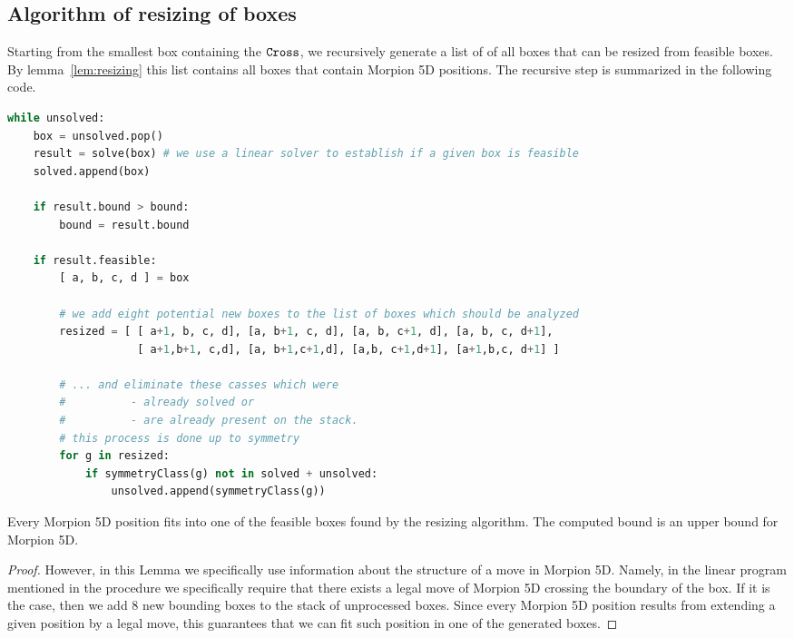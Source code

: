 \subsection{Algorithm of resizing of boxes}
Starting from the smallest box containing the $\texttt{Cross}$, we recursively generate a list of of all boxes 
  that can be resized from feasible boxes.
By lemma~\ref{lem:resizing} this list contains all boxes that contain Morpion 5D positions.
The recursive step is summarized in the following code.
\begin{lstlisting}[language = Python,
  basicstyle=\ttfamily\scriptsize,keywordstyle=\color{red},backgroundcolor=\color{white}]
while unsolved:
    box = unsolved.pop()
    result = solve(box) # we use a linear solver to establish if a given box is feasible
    solved.append(box)

    if result.bound > bound:
        bound = result.bound
        
    if result.feasible:
        [ a, b, c, d ] = box

        # we add eight potential new boxes to the list of boxes which should be analyzed
        resized = [ [ a+1, b, c, d], [a, b+1, c, d], [a, b, c+1, d], [a, b, c, d+1],
                    [ a+1,b+1, c,d], [a, b+1,c+1,d], [a,b, c+1,d+1], [a+1,b,c, d+1] ]
        
        # ... and eliminate these casses which were 
        #          - already solved or 
        #          - are already present on the stack.
        # this process is done up to symmetry 
        for g in resized:
            if symmetryClass(g) not in solved + unsolved:
                unsolved.append(symmetryClass(g))
\end{lstlisting}

\begin{lemma}
Every Morpion 5D position fits into one of the feasible boxes found by the resizing algorithm.
The computed bound is an upper bound for Morpion 5D.
\end{lemma}

\begin{proof}

However, in this Lemma we specifically use information about the structure of a move in Morpion 5D. Namely, in the linear program mentioned in the procedure we specifically require that there 
exists a legal move of Morpion 5D crossing the boundary of the box. If it is the case, then we add $8$ new bounding boxes to the stack of unprocessed boxes. Since every
Morpion 5D position results from extending a given position by a legal move, this guarantees that we can fit such position in one of the generated boxes. 
\end{proof} 

